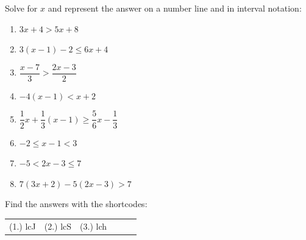 \begin{exercises}{ }
{
Solve for $x$ and represent the answer on a number line and in interval notation:
\begin{enumerate}[noitemsep, label=\textbf{\arabic*}. ] 

    \item $3x+4>5x+8$
    \item $3(x-1)-2\leq 6x+4$ \vspace{5pt}
    \item $\dfrac{x-7}{3}>\dfrac{2x-3}{2}$\vspace{5pt}
    \item $-4(x-1)<x+2$\vspace{5pt}
    \item $\dfrac{1}{2}x+\dfrac{1}{3}(x-1)\geq \dfrac{5}{6}x-\dfrac{1}{3}$ \vspace{5pt}
    \item $-2\leq x-1<3$ 
    \item $-5<2x-3\leq7$ 
\item $7(3x+2)-5(2x-3)>7$
    \end{enumerate}


\par {} Find the answers with the shortcodes:
\par \begin{tabular}[h]{cccccc}
(1.) lcJ  &  (2.) lcS  &  (3.) lch  & \end{tabular}
}
\end{exercises}

\summary
\nopagebreak

